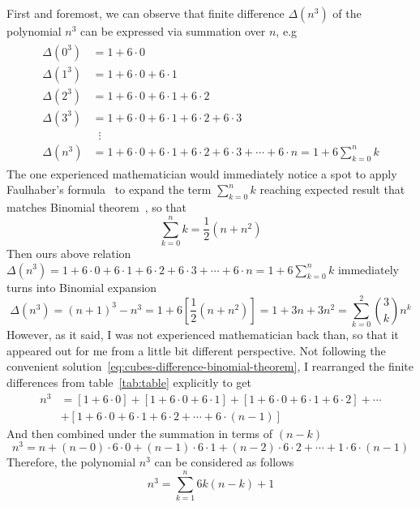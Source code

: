 First and foremost, we can observe that finite difference $\Delta(n^3)$ of the polynomial $n^3$
can be expressed via summation over $n$, e.g
\begin{align}
    \label{eq:cubes_interpolation}
    \begin{split}
        \Delta(0^3) &= 1+6 \cdot 0 \\
        \Delta(1^3) &= 1+6\cdot0+6\cdot1 \\
        \Delta(2^3) &= 1+6\cdot0+6\cdot1+6\cdot2 \\
        \Delta(3^3) &= 1+6\cdot0+6\cdot1+6\cdot2+6\cdot3 \\
        &\; \; \vdots \\
        \Delta(n^3) &= 1+6\cdot0+6\cdot1+6\cdot2+6\cdot3+\cdots+6\cdot n = 1 + 6 \sum_{k=0}^{n} k
    \end{split}
\end{align}
The one experienced mathematician would immediately notice a spot to apply Faulhaber's formula~\cite{beardon1996sums}
to expand the term $\sum_{k=0}^{n} k$ reaching expected result that matches Binomial theorem~\cite{abramowitz1988handbook},
so that
\begin{equation*}
    \sum_{k=0}^{n} k = \frac{1}{2}(n+n^2)
\end{equation*}
Then ours above relation $\Delta(n^3) = 1+6\cdot0+6\cdot1+6\cdot2+6\cdot3+\cdots+6\cdot n = 1 + 6 \sum_{k=0}^{n} k$
immediately turns into Binomial expansion
\begin{equation}
    \Delta(n^3) = (n+1)^3 - n^3 = 1 + 6 \left[ \frac{1}{2}(n+n^2) \right] = 1 + 3 n + 3 n^2 = \sum_{k=0}^{2} \binom{3}{k} n^k
    \label{eq:cubes-difference-binomial-theorem}
\end{equation}
However, as it said, I was not experienced mathematician back than,
so that it appeared out for me from a little bit different perspective.
Not following the convenient solution~\eqref{eq:cubes-difference-binomial-theorem},
I rearranged the finite differences from table~\eqref{tab:table} explicitly to get
\begin{align*}
    n^3 &= [1+6\cdot0]+[1+6\cdot0+6\cdot1]+[1+6\cdot0+6\cdot1+6\cdot2]+\cdots \\
    &+[1+6\cdot0+6\cdot1+6\cdot2+\cdots+6\cdot(n-1)]
\end{align*}
And then combined under the summation in terms of $(n-k)$
\[
    n^3 = n +(n-0) \cdot6 \cdot0 + (n-1)\cdot6\cdot1 + (n-2)\cdot6\cdot2 + \cdots+1\cdot6\cdot(n-1)
\]
Therefore, the polynomial $n^3$ can be considered as follows
\begin{equation}
    \label{eq:cube_identity}
    n^3 = \sum_{k=1}^{n} 6k(n-k) + 1
\end{equation}
